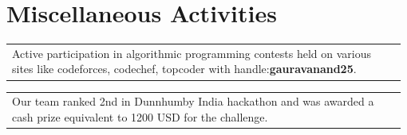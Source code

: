 \documentclass[a4paper]{article} %
\newcommand{\verticalspacing}{-0.25cm}
\newcommand{\headspace}{-0.3cm}
\newcommand{\bulletspace}{0.7cm}
\newcommand{\projectheadspacing}{6.9cm}
\newcommand{\gitproject}[3]{%
    \begin{tabular}{p{0.60\linewidth}r}
        \textcolor{NavyBlue}{\small #2} & \multicolumn{1}{m{ \projectheadspacing{} }}{\raggedleft #1}\\
    \end{tabular}\\
    \begin{tabular}{p{0.98\linewidth}}
        \vspace{\headspace{}}
        \small{#3}
    \end{tabular}
    \vspace{\verticalspacing{}}
    \vspace{-0.2cm} %
}
\newcommand{\skill}[2]{%
    \begin{tabular}{p{0.60\linewidth}r}
        \small {#2} & \multicolumn{1}{m{ \projectheadspacing{} }}{\raggedleft \textsc{\small #1}}\\
    \end{tabular}
    \vspace{\verticalspacing{}}
}
\newcommand{\lineskill}[2]{%
    \begin{tabular}{p{0.98\linewidth}r}
        \small {#2} & \multicolumn{1}{m{ \projectheadspacing{} }}{\raggedleft \textsc{\small #1}}\\
    \end{tabular}
    \vspace{\verticalspacing{}}
    \vspace{-0.0cm} %
}
\begin{document}

\section{Miscellaneous Activities}

%
%


\lineskill
	{}
    {Active participation in algorithmic programming contests held on various sites like codeforces, codechef, topcoder with handle:{\textbf{gauravanand25}}.}

\lineskill
	{}
	{Our team ranked 2nd in Dunnhumby India hackathon and was awarded a cash prize equivalent to 1200 USD for the challenge.}
\end{document}
